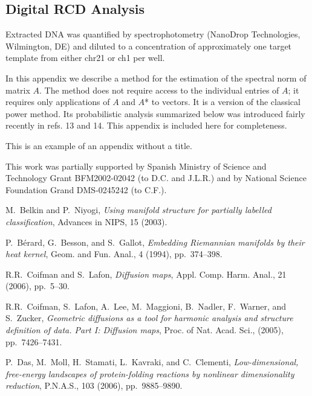 \documentclass{pnastwo}
\begin{document}
\begin{article}
\begin{materials}
\section{Digital RCD Analysis} Extracted DNA was quantified by
spectrophotometry (NanoDrop Technologies, Wilmington, DE) and diluted to a
concentration of
approximately one target template from either chr21 or ch1 per well.
\end{materials}

In this appendix we describe a method for the estimation of the spectral norm
of matrix $A$. The method does not require access to the individual
entries of $A$; it requires only applications of $A$ and $A$* to vectors.
It is a version of the classical power method. Its probabilistic
analysis summarized below was introduced fairly recently in refs. 13
and 14. This appendix is included here for completeness.


\appendix
This is an example of an appendix without a title.

\begin{acknowledgments}
This work was partially supported by
Spanish Ministry of Science and Technology Grant BFM2002-02042 (to D.C. and
J.L.R.) and by National Science Foundation Grand DMS-0245242 (to C.F.).
\end{acknowledgments}

\begin{thebibliography}{10}
M.~Belkin and P.~Niyogi, {\em Using manifold structure for partially
  labelled classification}, Advances in NIPS, 15 (2003).

P.~B\'erard, G.~Besson, and S.~Gallot, {\em Embedding {R}iemannian
  manifolds by their heat kernel}, Geom. and Fun. Anal., 4 (1994),
  pp.~374--398.

R.R.~Coifman and S.~Lafon, {\em Diffusion maps}, Appl. Comp. Harm. Anal.,
  21 (2006), pp.~5--30.

R.R.~Coifman, S.~Lafon, A.~Lee, M.~Maggioni, B.~Nadler, F.~Warner, and
  S.~Zucker, {\em Geometric diffusions as a tool for harmonic analysis and
  structure definition of data. {P}art {I}: Diffusion maps}, Proc. of Nat.
  Acad. Sci.,  (2005), pp.~7426--7431.

P.~Das, M.~Moll, H.~Stamati, L.~Kavraki, and C.~Clementi, {\em
  Low-dimensional, free-energy landscapes of protein-folding reactions by
  nonlinear dimensionality reduction}, P.N.A.S., 103 (2006), pp.~9885--9890.


\end{thebibliography}
\end{article}
\end{document}
